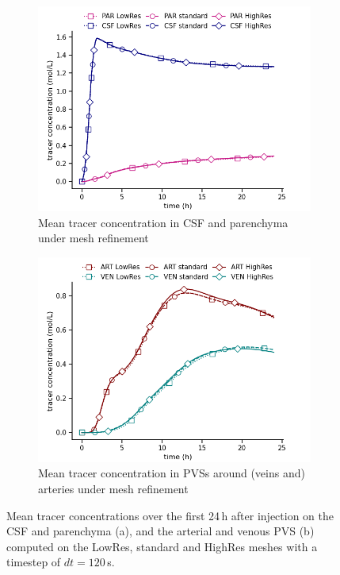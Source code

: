 \begin{figure}
    \centering
    \begin{subfigure}[b]{0.45\textwidth}
        \centering
        \includegraphics[width = 1 \linewidth]{figures/mesh_refinement_par_csf_mean.png}
        \caption{Mean tracer concentration in CSF and parenchyma under mesh refinement}
    \end{subfigure}
    \begin{subfigure}[b]{0.45\textwidth}
        \centering
     \includegraphics[width= 1 \linewidth]{figures/mesh_refinement_art_ven_mean.png}
         \caption{Mean tracer concentration in PVSs around (veins and) arteries  under mesh refinement}
    \end{subfigure}
    \caption{Mean tracer concentrations over the first 24\,h after injection on the CSF and parenchyma (a), and the arterial and venous PVS (b) computed on the LowRes, standard and HighRes meshes with a timestep of $dt=120$\,s.}
    \label{fig:mesh_convergence_concentrations}
\end{figure}


